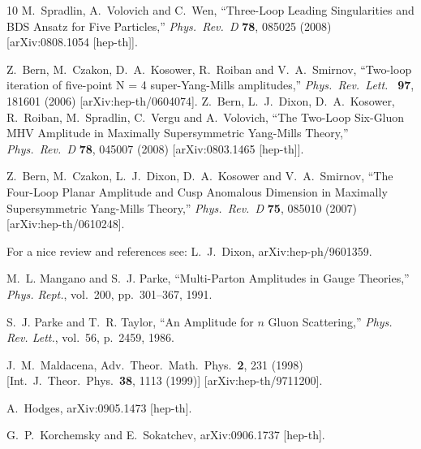 \documentclass[12pt]{article}
\begin{document}
\begin{thebibliography}{10}
  M.~Spradlin, A.~Volovich and C.~Wen,
  ``{Three-Loop Leading Singularities and BDS Ansatz for Five Particles},''
  {\em Phys.\ Rev.\  D} {\bf 78}, 085025 (2008)
  [arXiv:0808.1054 [hep-th]].

  Z.~Bern, M.~Czakon, D.~A.~Kosower, R.~Roiban and V.~A.~Smirnov,
  ``{Two-loop iteration of five-point N = 4 super-Yang-Mills amplitudes},''
  {\em Phys.\ Rev.\ Lett.\ } {\bf 97}, 181601 (2006)
  [arXiv:hep-th/0604074].
Z.~Bern, L.~J.~Dixon, D.~A.~Kosower, R.~Roiban, M.~Spradlin, C.~Vergu and A.~Volovich,
  ``{The Two-Loop Six-Gluon MHV Amplitude in Maximally Supersymmetric Yang-Mills
  Theory},''
  {\em Phys.\ Rev.\  D} {\bf 78}, 045007 (2008)
  [arXiv:0803.1465 [hep-th]].


  Z.~Bern, M.~Czakon, L.~J.~Dixon, D.~A.~Kosower and V.~A.~Smirnov,
  ``{The Four-Loop Planar Amplitude and Cusp Anomalous Dimension in Maximally
  Supersymmetric Yang-Mills Theory},''
  {\em Phys.\ Rev.\  D} {\bf 75}, 085010 (2007)
  [arXiv:hep-th/0610248].

For a nice review and references see:  L.~J.~Dixon,
  arXiv:hep-ph/9601359.



M.~L. Mangano and S.~J. Parke, ``{Multi-Parton Amplitudes in Gauge Theories},''
  {\em Phys. Rept.}, vol.~200, pp.~301--367, 1991.

S.~J. Parke and T.~R. Taylor, ``{An Amplitude for $n$ Gluon Scattering},'' {\em
  Phys. Rev. Lett.}, vol.~56, p.~2459, 1986.
  
  
 J.~M.~Maldacena,
 Adv.\ Theor.\ Math.\ Phys.\  {\bf 2}, 231 (1998)
 [Int.\ J.\ Theor.\ Phys.\  {\bf 38}, 1113 (1999)]
 [arXiv:hep-th/9711200].

 A.~Hodges,
  arXiv:0905.1473 [hep-th].

  G.~P.~Korchemsky and E.~Sokatchev,
  arXiv:0906.1737 [hep-th].


\end{thebibliography}
\end{document}

